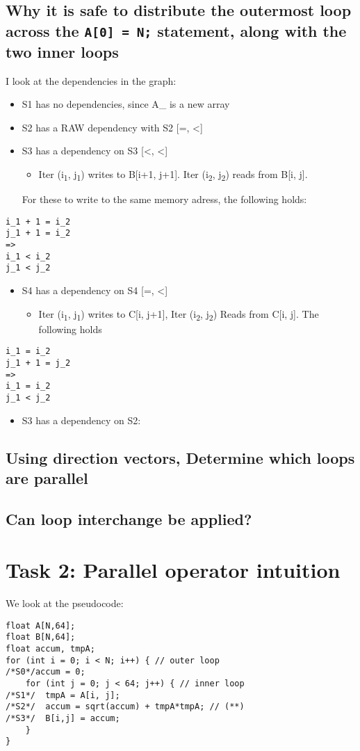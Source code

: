 \documentclass[11pt]{article}
\begin{document}
\subsection{Why it is safe to distribute the outermost loop across the \texttt{A[0] = N;} statement, along with the two inner loops}
\label{sec:org5dbf5df}
I look at the dependencies in the graph:  
\begin{itemize}
\item S1 has no dependencies, since A\_ is a new array
\item S2 has a RAW dependency with S2 [=, <]
\item S3 has a dependency on S3 [<, <]  
\begin{itemize}
\item Iter (i\textsubscript{1}, j\textsubscript{1}) writes to B[i+1, j+1]. Iter (i\textsubscript{2}, j\textsubscript{2}) reads from B[i, j].
\end{itemize}
For these to write to the same memory adress, the following holds:
\end{itemize}
\begin{verbatim}
i_1 + 1 = i_2
j_1 + 1 = i_2
=>
i_1 < i_2
j_1 < j_2
\end{verbatim}
\begin{itemize}
\item S4 has a dependency on S4 [=, <]
\begin{itemize}
\item Iter (i\textsubscript{1}, j\textsubscript{1}) writes to C[i, j+1], Iter (i\textsubscript{2}, j\textsubscript{2}) Reads from C[i, j]. The following holds
\end{itemize}
\end{itemize}
\begin{verbatim}
i_1 = i_2
j_1 + 1 = j_2
=>
i_1 = i_2
j_1 < j_2
\end{verbatim}
\begin{itemize}
\item S3 has a dependency on S2:
\end{itemize}
\subsection{Using direction vectors, Determine which loops are parallel}
\label{sec:org50bf447}
\subsection{Can loop interchange be applied?}
\label{sec:orgab91a4a}
\section{Task 2: Parallel operator intuition}
\label{sec:org62ad9aa}
We look at the pseudocode:
\begin{verbatim}
float A[N,64];
float B[N,64];
float accum, tmpA;
for (int i = 0; i < N; i++) { // outer loop
/*S0*/accum = 0;
    for (int j = 0; j < 64; j++) { // inner loop
/*S1*/  tmpA = A[i, j];
/*S2*/  accum = sqrt(accum) + tmpA*tmpA; // (**)
/*S3*/  B[i,j] = accum;
    }
}
\end{verbatim}
\end{document}
